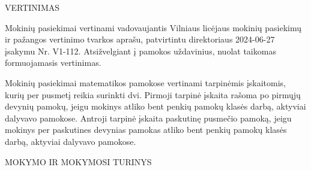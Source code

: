 \documentclass[11pt,a4paper]{article}
\newcommand{\DocHeading}[1]{%
  \vspace{0.75\baselineskip}%
  {\large #1}\par
  \vspace{0.15\baselineskip}%
}
\begin{document}
\DocHeading{VERTINIMAS}

\newpage



\setlength{\parindent}{0.9cm}

Mokinių pasiekimai vertinami vadovaujantis Vilniaus licėjaus mokinių
pasiekimų ir pažangos vertinimo tvarkos aprašu, patvirtintu direktoriaus
2024-06-27 įsakymu Nr. V1-112. Atsižvelgiant į pamokos uždavinius,
nuolat taikomas formuojamasis vertinimas.

Mokinių pasiekimai matematikos pamokose vertinami tarpinėmis įskaitomis,
kurių per pusmetį reikia surinkti dvi. Pirmoji tarpinė įskaita rašoma po
pirmųjų devynių pamokų, jeigu mokinys atliko bent penkių pamokų klasės
darbą, aktyviai dalyvavo pamokose. Antroji tarpinė įskaita paskutinę
pusmečio pamoką, jeigu mokinys per paskutines devynias pamokas atliko
bent penkių pamokų klasės darbą, aktyviai dalyvavo pamokose.

\setlength{\parindent}{0pt}

\vspace{0.28cm}
\newpage
{\large MOKYMO IR MOKYMOSI TURINYS}\par 

\vspace{0.5cm}

\begingroup

\fontsize{9.5}{10.1}\selectfont

\end{document}
